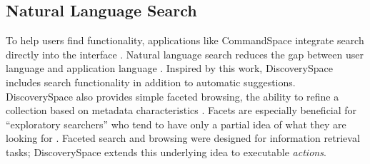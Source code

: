 \subsection{Natural Language Search}
To help users find functionality, applications like CommandSpace integrate search directly into the interface \cite{Adar2014}. Natural language search reduces the gap between user language and application language \cite{Adar2014}. Inspired by this work, Discovery\-Space includes search functionality in addition to automatic suggestions. Discovery\-Space also provides simple faceted browsing, the ability to refine a collection based on metadata characteristics \cite{Koren2008}. Facets are especially beneficial for ``exploratory searchers'' who tend to have only a partial idea of what they are looking for \cite{Hearst2006}. Faceted search and browsing were designed for information retrieval tasks; Discovery\-Space extends this underlying idea to executable \textit{actions}.
